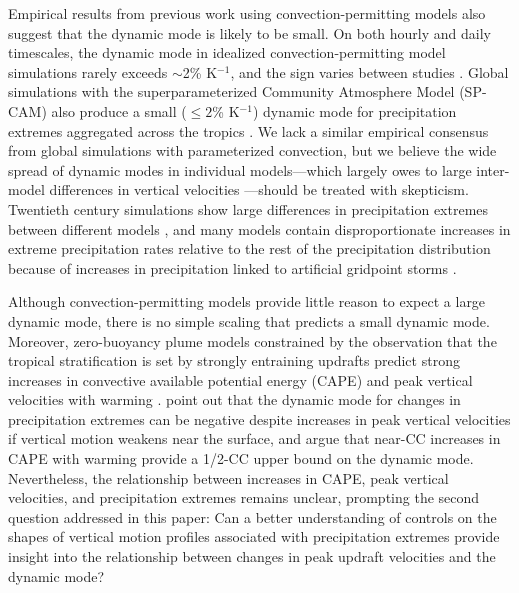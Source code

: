 \documentclass[twocol]{ametsoc}
\begin{document}
Empirical results from previous work using convection-permitting models also suggest that the dynamic mode is likely to be small. On both hourly and daily timescales, the dynamic mode in idealized convection-permitting model simulations rarely exceeds $\sim$2\% K$^{-1}$, and the sign varies between studies \citep{Muller2011IntensificationModel,Romps2011ResponseWarming,Muller2013ImpactWarming}. Global simulations with the superparameterized Community Atmosphere Model (SP-CAM) also produce a small ($\le 2$\% K$^{-1}$) dynamic mode for precipitation extremes aggregated across the tropics \citep{Fildier2017SimultaneousChange}. We lack a similar empirical consensus from global simulations with parameterized convection, but we believe the wide spread of dynamic modes in individual models---which largely owes to large inter-model differences in vertical velocities \citep{Ogorman2009ScalingGCM,OGorman2009TheChange,Norris2019ThermodynamicEnsemble,Pendergrass2014ChangesWarming}---should be treated with skepticism. Twentieth century simulations show large differences in precipitation extremes between different models \citep{Kharin2007ChangesSimulations}, and many models contain disproportionate increases in extreme precipitation rates relative to the rest of the precipitation distribution because of increases in precipitation linked to artificial gridpoint storms \citep{Pendergrass2014ChangesWarming,Pendergrass2014TwoRain}.

Although convection-permitting models provide little reason to expect a large dynamic mode, there is no simple scaling that predicts a small dynamic mode. Moreover, zero-buoyancy plume models constrained by the observation that the tropical stratification is set by strongly entraining updrafts \citep{KuangBretherton2006,Romps2009DoTroposphere,Singh2013InfluenceEquilibrium} predict strong increases in convective available potential energy (CAPE) and peak vertical velocities with warming \citep{Singh2015IncreasesEquilibrium,Seeley2015WhyWarming,Romps2016ClausiusClapeyronRCE}.
\citet{Muller2011IntensificationModel} point out that the dynamic  mode for changes in precipitation extremes can be negative despite increases in peak vertical velocities if vertical motion weakens near the surface, and \citet{Fildier2017SimultaneousChange} argue that near-CC increases in CAPE with warming \citep{Seeley2015WhyWarming,Romps2016ClausiusClapeyronRCE} provide a 1/2-CC upper bound on the dynamic mode. Nevertheless, the relationship between increases in CAPE, peak vertical velocities, and precipitation extremes remains unclear, prompting the second question addressed in this paper: Can a better understanding of controls on the shapes of vertical motion profiles associated with precipitation extremes provide insight into the relationship between changes in peak updraft velocities and the dynamic mode?
\end{document}
